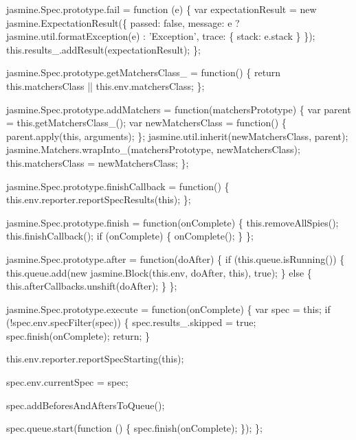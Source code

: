 \begin{DoxyCodeInclude}
jasmine.Spec.prototype.fail = \textcolor{keyword}{function} (e) \{
  var expectationResult = \textcolor{keyword}{new} jasmine.ExpectationResult(\{
    passed: \textcolor{keyword}{false},
    message: e ? jasmine.util.formatException(e) : \textcolor{stringliteral}{'Exception'},
    trace: \{ stack: e.stack \}
  \});
  this.results\_.addResult(expectationResult);
\};

jasmine.Spec.prototype.getMatchersClass\_ = \textcolor{keyword}{function}() \{
  \textcolor{keywordflow}{return} this.matchersClass || this.env.matchersClass;
\};

jasmine.Spec.prototype.addMatchers = \textcolor{keyword}{function}(matchersPrototype) \{
  var parent = this.getMatchersClass\_();
  var newMatchersClass = \textcolor{keyword}{function}() \{
    parent.apply(\textcolor{keyword}{this}, arguments);
  \};
  jasmine.util.inherit(newMatchersClass, parent);
  jasmine.Matchers.wrapInto\_(matchersPrototype, newMatchersClass);
  this.matchersClass = newMatchersClass;
\};

jasmine.Spec.prototype.finishCallback = \textcolor{keyword}{function}() \{
  this.env.reporter.reportSpecResults(\textcolor{keyword}{this});
\};

jasmine.Spec.prototype.finish = \textcolor{keyword}{function}(onComplete) \{
  this.removeAllSpies();
  this.finishCallback();
  \textcolor{keywordflow}{if} (onComplete) \{
    onComplete();
  \}
\};

jasmine.Spec.prototype.after = \textcolor{keyword}{function}(doAfter) \{
  \textcolor{keywordflow}{if} (this.queue.isRunning()) \{
    this.queue.add(\textcolor{keyword}{new} jasmine.Block(\textcolor{keyword}{this}.env, doAfter, \textcolor{keyword}{this}), \textcolor{keyword}{true});
  \} \textcolor{keywordflow}{else} \{
    this.afterCallbacks.unshift(doAfter);
  \}
\};

jasmine.Spec.prototype.execute = \textcolor{keyword}{function}(onComplete) \{
  var spec = \textcolor{keyword}{this};
  \textcolor{keywordflow}{if} (!spec.env.specFilter(spec)) \{
    spec.results\_.skipped = \textcolor{keyword}{true};
    spec.finish(onComplete);
    \textcolor{keywordflow}{return};
  \}

  this.env.reporter.reportSpecStarting(\textcolor{keyword}{this});

  spec.env.currentSpec = spec;

  spec.addBeforesAndAftersToQueue();

  spec.queue.start(\textcolor{keyword}{function} () \{
    spec.finish(onComplete);
  \});
\};


\end{DoxyCodeInclude}
